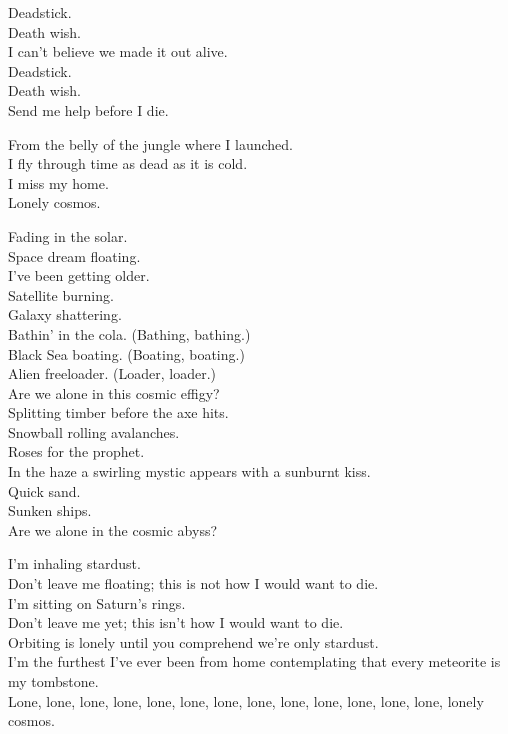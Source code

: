 Deadstick. \\
Death wish. \\
I can't believe we made it out alive. \\
Deadstick. \\
Death wish. \\
Send me help before I die. \\




From the belly of the jungle where I launched. \\
I fly through time as dead as it is cold. \\
I miss my home. \\
Lonely cosmos. \\


Fading in the solar. \\
Space dream floating. \\
I've been getting older. \\
Satellite burning. \\
Galaxy shattering. \\
Bathin' in the cola. (Bathing, bathing.) \\
Black Sea boating. (Boating, boating.) \\
Alien freeloader. (Loader, loader.) \\
Are we alone in this cosmic effigy? \\

Splitting timber before the axe hits. \\
Snowball rolling avalanches. \\
Roses for the prophet. \\
In the haze a swirling mystic appears with a sunburnt kiss. \\
Quick sand. \\
Sunken ships. \\
Are we alone in the cosmic abyss? \\


I'm inhaling stardust. \\
Don't leave me floating; this is not how I would want to die. \\
I'm sitting on Saturn's rings. \\
Don't leave me yet; this isn't how I would want to die. \\
Orbiting is lonely until you comprehend we're only stardust. \\
I'm the furthest I've ever been from home contemplating that every meteorite is my tombstone. \\
Lone, lone, lone, lone, lone, lone, lone, lone, lone, lone, lone, lone, lone, lonely cosmos. \\

